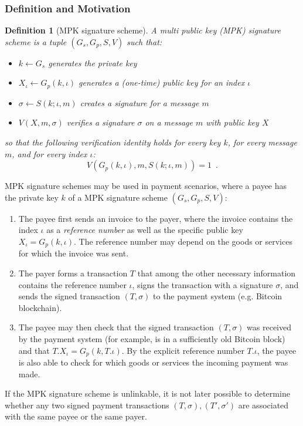 \documentclass{article}
\newtheorem{definition}{Definition}[section]
\begin{document}
\subsubsection{Definition and Motivation}

\begin{definition}[MPK signature scheme]
A multi public key (MPK) signature scheme is a tuple $(G_s,G_p,S,V)$ such that:
\begin{itemize}
\item $k\gets G_s$ generates the private key
\item $X_\iota\gets G_p(k,\iota)$ generates a (one-time) public key for an index $\iota$
\item $\sigma\gets S(k;\iota,m)$ creates a signature for a message $m$
\item $V(X,m,\sigma)$ verifies a signature $\sigma$ on a message $m$ with public key $X$
\end{itemize}
so that the following verification identity holds for every key $k$, for every message $m$, and for every index $\iota$:
\[
V(G_p(k,\iota),m,S(k;\iota,m))=1\enspace.
\]
\end{definition}
MPK signature schemes may be used in payment scenarios, where a payee has the private key $k$ of a MPK signature scheme
$(G_s,G_p,S,V)$:
\begin{enumerate}
\item The payee first sends an invoice to the payer, where the invoice contains the index $\iota$ as a \emph{reference number} as well as the specific public key $X_\iota =G_p(k,\iota)$. The reference number may depend on the goods or services for which the invoice was sent.
\item The payer forms a transaction $T$ that among the other necessary information contains the reference number $\iota$, signs the transaction with a signature $\sigma$, and sends the signed transaction $(T,\sigma)$ to the payment system (e.g. Bitcoin blockchain).
\item The payee may then check that the signed transaction $(T,\sigma)$ was received by the payment system (for example, is in a sufficiently old Bitcoin block) and that
$T.X_\iota=G_p(k,T.\iota)$. By the explicit reference number $T.\iota$, the payee is also able to check for which goods or services the incoming payment was made.
\end{enumerate}
If the MPK signature scheme is unlinkable, it is not later possible to determine whether any two signed payment transactions $(T,\sigma), (T',\sigma')$
are associated with the same payee or the same payer.
\end{document}
